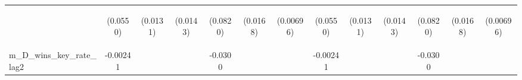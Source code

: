 \documentclass[]{article}
\begin{document}
\begin{center}
\begin{tabular}{lcccccccccccc}
\vspace{4pt} & \begin{footnotesize}(0.0550)\end{footnotesize} & \begin{footnotesize}(0.0131)\end{footnotesize} & \begin{footnotesize}(0.0143)\end{footnotesize} & \begin{footnotesize}(0.0820)\end{footnotesize} & \begin{footnotesize}(0.0168)\end{footnotesize} & \begin{footnotesize}(0.00696)\end{footnotesize} & \begin{footnotesize}(0.0550)\end{footnotesize} & \begin{footnotesize}(0.0131)\end{footnotesize} & \begin{footnotesize}(0.0143)\end{footnotesize} & \begin{footnotesize}(0.0820)\end{footnotesize} & \begin{footnotesize}(0.0168)\end{footnotesize} & \begin{footnotesize}(0.00696)\end{footnotesize} \\
m\_D\_wins\_key\_rate\_lag2 & -0.00241 &  &  & -0.0300 &  &  & -0.00241 &  &  & -0.0300 &  &  \\

\end{tabular}
\end{center}
\end{document}
